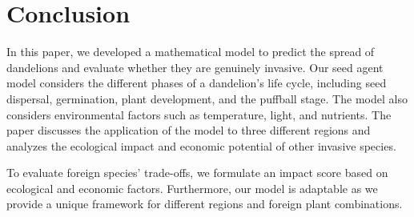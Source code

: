 \section{Conclusion}
In this paper, we developed a mathematical model to predict the spread of dandelions and evaluate whether they are genuinely invasive. Our seed agent model considers the different phases of a dandelion's life cycle, including seed dispersal, germination, plant development, and the puffball stage. The model also considers environmental factors such as temperature, light, and nutrients. The paper discusses the application of the model to three different regions and analyzes the ecological impact and economic potential of other invasive species.

To evaluate foreign species' trade-offs, we formulate an impact score based on ecological and economic factors. Furthermore, our model is adaptable as we provide a unique framework for different regions and foreign plant combinations. 